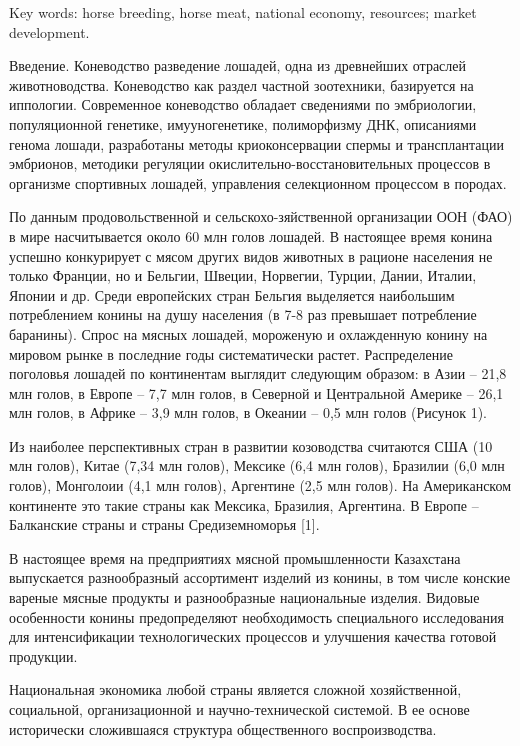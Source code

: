 Key words: horse breeding, horse meat, national economy, resources;
market development.
\begin{multicols}{2}

Введение. Коневодство разведение лошадей, одна из древнейших отраслей
животноводства. Коневодство как раздел частной зоотехники, базируется на
иппологии. Современное коневодство обладает сведениями по эмбриологии,
популяционной генетике, имууногенетике, полиморфизму ДНК, описаниями
генома лошади, разработаны методы криоконсервации спермы и
трансплантации эмбрионов, методики регуляции
окислительно-восстановительных процессов в организме спортивных лошадей,
управления селекционном процессом в породах.

По данным продовольственной и сельскохо-зяйственной организации ООН (ФАО)
в мире насчитывается около 60 млн голов лошадей. В настоящее время
конина успешно конкурирует с мясом других видов животных в рационе
населения не только Франции, но и Бельгии, Швеции, Норвегии, Турции,
Дании, Италии, Японии и др. Среди европейских стран Бельгия выделяется
наибольшим потреблением конины на душу населения (в 7-8 раз превышает
потребление баранины). Спрос на мясных лошадей, мороженую и охлажденную
конину на мировом рынке в последние годы систематически растет.
Распределение поголовья лошадей по континентам выглядит следующим
образом: в Азии -- 21,8 млн голов, в Европе -- 7,7 млн голов, в Северной
и Центральной Америке -- 26,1 млн голов, в Африке -- 3,9 млн голов, в
Океании -- 0,5 млн голов (Рисунок 1).


Из наиболее перспективных стран в развитии козоводства считаются США (10
млн голов), Китае (7,34 млн голов), Мексике (6,4 млн голов), Бразилии
(6,0 млн голов), Монголоии (4,1 млн голов), Аргентине (2,5 млн голов).
На Американском континенте это такие страны как Мексика, Бразилия,
Аргентина. В Европе -- Балканские страны и страны Средиземноморья
{[}1{]}.



В настоящее время на предприятиях мясной промышленности Казахстана
выпускается разнообразный ассортимент изделий из конины, в том числе
конские вареные мясные продукты и разнообразные национальные изделия.
Видовые особенности конины предопределяют необходимость специального
исследования для интенсификации технологических процессов и улучшения
качества готовой продукции.


Национальная экономика любой страны является сложной хозяйственной,
социальной, организационной и научно-технической системой. В ее основе
исторически сложившаяся структура общественного воспроизводства.

\end{multicols}

